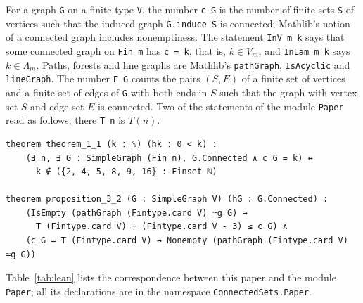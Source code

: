 \documentclass[11pt]{amsart}
\theoremstyle{definition}
\theoremstyle{remark}
\newcommand{\Lam}{\Lambda}
\newcommand{\Tr}[1]{T(#1)}
\begin{document}
For a graph \texttt{G} on a finite type \texttt{V}, the number \texttt{c G} is the number of finite sets \texttt{S} of vertices such that the induced graph \texttt{G.induce S} is connected; Mathlib's notion of a connected graph includes nonemptiness. The statement \texttt{InV m k} says that some connected graph on \texttt{Fin m} has \texttt{c = k}, that is, $k\in V_m$, and \texttt{InLam m k} says $k\in\Lam_m$. Paths, forests and line graphs are Mathlib's \texttt{pathGraph}, \texttt{IsAcyclic} and \texttt{lineGraph}. The number \texttt{F G} counts the pairs $(S,E)$ of a finite set of vertices and a finite set of edges of \texttt{G} with both ends in $S$ such that the graph with vertex set $S$ and edge set $E$ is connected. Two of the statements of the module \texttt{Paper} read as follows; there \texttt{T n} is $\Tr{n}$.
\begin{verbatim}
theorem theorem_1_1 (k : ℕ) (hk : 0 < k) :
    (∃ n, ∃ G : SimpleGraph (Fin n), G.Connected ∧ c G = k) ↔
      k ∉ ({2, 4, 5, 8, 9, 16} : Finset ℕ)

theorem proposition_3_2 (G : SimpleGraph V) (hG : G.Connected) :
    (IsEmpty (pathGraph (Fintype.card V) ≃g G) →
      T (Fintype.card V) + (Fintype.card V - 3) ≤ c G) ∧
    (c G = T (Fintype.card V) ↔ Nonempty (pathGraph (Fintype.card V) ≃g G))
\end{verbatim}

Table~\ref{tab:lean} lists the correspondence between this paper and the module \texttt{Paper}; all its declarations are in the namespace \texttt{ConnectedSets.Paper}.
\end{document}
